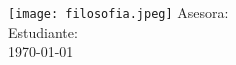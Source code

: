 \begin{titlepage}
    \begin{center}
        \vspace*{1cm}

        \Huge
        \textbf{\universityName}

        \vspace{0.5cm}
        \LARGE
        \schoolName

        \vspace{1.5cm}

        \textbf{\titleName}

        \vspace{0.8cm}

        \texttt{[image: filosofia.jpeg]}
        \vfill
        \Large
        Asesora: \asesorName\\
        Estudiante: \authorName\\
        \today

    \end{center}
\end{titlepage}
